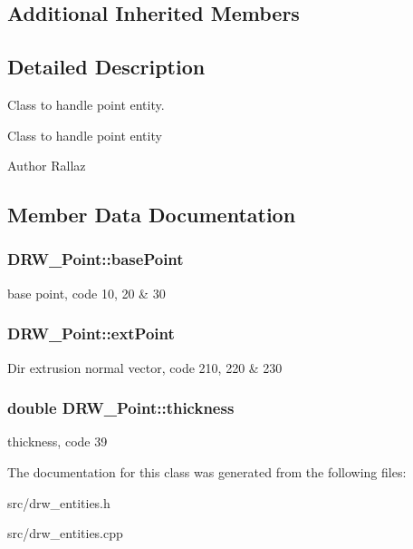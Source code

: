\subsection*{Additional Inherited Members}


\subsection{Detailed Description}
Class to handle point entity. 

Class to handle point entity \begin{DoxyAuthor}{Author}
Rallaz 
\end{DoxyAuthor}


\subsection{Member Data Documentation}
\hypertarget{class_d_r_w___point_afaa15dc45c45d9057257e478c9746169}{}
\subsubsection[{base\+Point}]{ D\+R\+W\+\_\+\+Point\+::base\+Point}\label{class_d_r_w___point_afaa15dc45c45d9057257e478c9746169}
base point, code 10, 20 \& 30 \hypertarget{class_d_r_w___point_ab55e32170a648e8469844c886ff56fc7}{}
\subsubsection[{ext\+Point}]{ D\+R\+W\+\_\+\+Point\+::ext\+Point}\label{class_d_r_w___point_ab55e32170a648e8469844c886ff56fc7}
Dir extrusion normal vector, code 210, 220 \& 230 \hypertarget{class_d_r_w___point_a909f6f2623e3b5cf40393636f3119954}{}
\subsubsection[{thickness}]{\setlength{\rightskip}{0pt plus 5cm}double D\+R\+W\+\_\+\+Point\+::thickness}\label{class_d_r_w___point_a909f6f2623e3b5cf40393636f3119954}
thickness, code 39 

The documentation for this class was generated from the following files\+:\begin{DoxyCompactItemize}
\item 
src/drw\+\_\+entities.\+h\item 
src/drw\+\_\+entities.\+cpp\end{DoxyCompactItemize}
